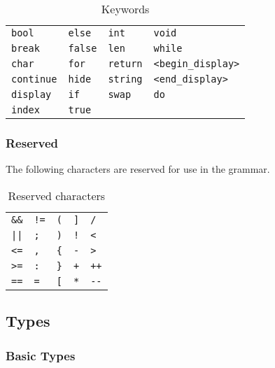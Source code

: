 \begin{table}[htp]
  \centering
  \begin{tabular}{llll}
    \verb"bool" \hspace{2cm} & \verb"else" \hspace{2cm} & \verb"int" \hspace{2cm} & \verb"void" \\
    \verb"break" & \verb"false" & \verb"len" & \verb"while" \\
    \verb"char" & \verb"for" & \verb"return" & \verb"<begin_display>" \\
		\verb"continue" & \verb"hide" & \verb"string" & \verb"<end_display>" \\
		\verb"display" & \verb"if" & \verb"swap" & \verb"do" \\
		\verb"index" & \verb"true"
  \end{tabular}
  \caption{Keywords}
  \label{tab:keywords}
\end{table}

\subsubsection{Reserved}
The following characters are reserved for use in the grammar.

\begin{table}[htp]
  \centering
  \begin{tabular}{lllll}
    \verb"&&" \hspace{1cm} & \verb"!=" \hspace{1cm} & \verb"(" \hspace{1cm} & \verb"]" \hspace{1cm} & \verb"/" \\
    \verb"||" & \verb";" & \verb")" & \verb"!" & \verb"<" \\
    \verb"<=" & \verb"," & \verb"{" & \verb"-" & \verb">" \\
    \verb">=" & \verb":" & \verb"}" & \verb"+" & \verb"++" \\
    \verb"==" & \verb"=" & \verb"[" & \verb"*" & \verb"--"
  \end{tabular}
  \caption{Reserved characters}
  \label{tab:reserved}
\end{table}


\subsection{Types}

\subsubsection{Basic Types}

